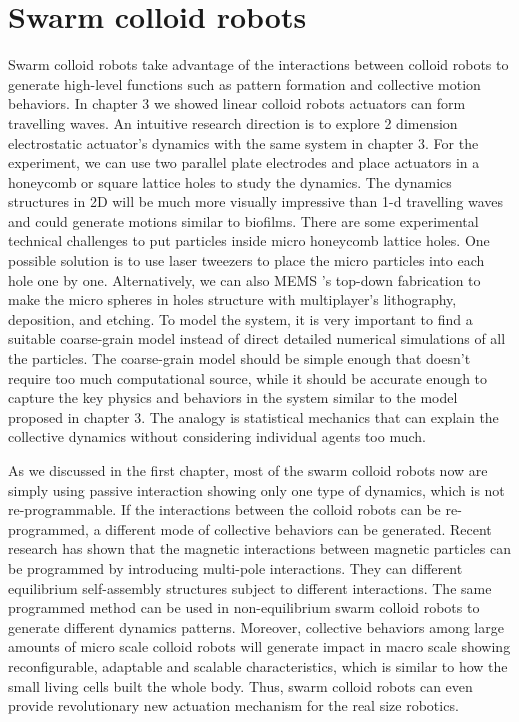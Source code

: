 \section{Swarm colloid robots}
Swarm colloid robots take advantage of the interactions between colloid robots to generate high-level functions such as pattern formation and collective motion behaviors. In chapter 3 we showed linear colloid robots actuators can form travelling waves. An intuitive research direction is to explore 2 dimension electrostatic actuator's dynamics with the same system in chapter 3. For the experiment, we can use two parallel plate electrodes and place actuators in a honeycomb or square lattice  holes to study the dynamics. The dynamics structures in 2D will be much more visually impressive than  1-d travelling waves and could generate motions similar to biofilms. There are some experimental technical challenges to put particles  inside micro honeycomb lattice holes. One possible solution is to use laser tweezers to place the micro particles into each hole one by one. Alternatively, we can also MEMS 's top-down fabrication to make the micro spheres in  holes structure with multiplayer's lithography, deposition, and etching. To model the system, it is very important to find a suitable coarse-grain model instead of direct detailed numerical simulations of all the particles. The coarse-grain model should be simple enough that doesn't require too much computational source, while it should be accurate enough to capture the key physics and  behaviors in the system similar to the model proposed in chapter 3. The analogy is statistical mechanics that can explain the collective dynamics without considering individual agents too much.

As we discussed in the first chapter, most of the swarm colloid robots now are simply using passive interaction showing only one type of dynamics, which is not re-programmable. If the interactions between the colloid robots can be re-programmed, a different mode of collective behaviors can be generated. Recent research has shown that the magnetic interactions between magnetic particles   can be programmed by introducing multi-pole interactions. They can  different  equilibrium self-assembly structures subject to different interactions. \cite{niu2019magnetic} The same programmed method can be used in non-equilibrium swarm colloid robots to generate different dynamics patterns. Moreover, collective behaviors among large amounts of micro scale colloid robots  will generate impact in macro scale showing reconfigurable, adaptable and scalable  characteristics,  which is similar to  how the small living cells built the whole body. Thus, swarm colloid robots can even provide revolutionary new actuation mechanism for the real size robotics. 
